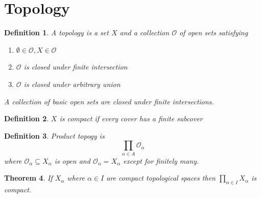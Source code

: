 \documentclass[a4paper]{article}
\newtheorem{thm}{Theorem}[section]
\newtheorem{defn}[thm]{Definition}
\begin{document}
\section{Topology}
\begin{defn}
    A topology is a set $X$ and a collection $\mathcal{O}$ of open sets satisfying
    \begin{enumerate}
        \item $\emptyset\in \mathcal{O}, X\in \mathcal{O}$
        \item $\mathcal{O}$ is closed under finite intersection
        \item $\mathcal{O}$ is closed under arbitrary union
    \end{enumerate}
    A collection of basic open sets are closed under finite intersections. 
\end{defn}
\begin{defn}
    $X$ is compact if every cover has a finite subcover
\end{defn}
\begin{defn}
    Product topogy is $$\prod_{\alpha\in A}\mathcal{O}_\alpha$$ where $\mathcal{O}_\alpha\subseteq X_\alpha$ is open and $\mathcal{O}_\alpha=X_\alpha$ except for finitely many.
\end{defn}
\begin{thm}
    If $X_\alpha$ where $\alpha\in I$ are compact topological spaces then $\prod_{\alpha\in I}X_\alpha$ is compact.
\end{thm}
\end{document}
